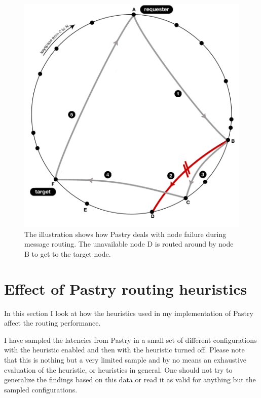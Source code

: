 \begin{figure}[!htb]
\begin{center}
  \includegraphics[width=0.9\linewidth]{illustrations/PastryRoutingFailed.png}
  \caption{The illustration shows how Pastry deals with node failure during message routing. The unavailable node D is routed around by node B to get to the target node.}
  \label{figurePastryFailedLookup}
\end{center}
\end{figure}


\section{Effect of Pastry routing heuristics}
In this section I look at how the heuristics used in my implementation of Pastry affect the routing performance. 

I have sampled the latencies from Pastry in a small set of different configurations with the heuristic enabled and then with the heuristic turned off. Please note that this is nothing but a very limited sample and by no means an exhaustive evaluation of the heuristic, or heuristics in general. One should not try to generalize the findings based on this data or read it as valid for anything but the sampled configurations.

